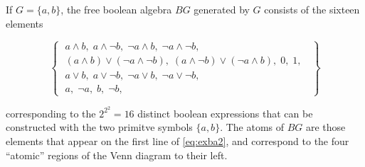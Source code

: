 \documentclass[subfiles]{the-pdg-manual.tex}
\begin{document}
\begin{example}
	If $G = \{a, b\}$, the free boolean algebra $BG$ generated by $G$ consists of the sixteen elements

	\medskip
	\begin{minipage}{0.3\textwidth}
		\begin{center}%
			\label{fig:ven2BA}
		\end{center}
	\end{minipage}\begin{minipage}{0.65\textwidth}
		\begin{equation} \left\{\;
			\begin{aligned}
				a \land b,\; a \land \lnot b,\; \lnot a \land b,\; \lnot a \land \lnot b,\; \\
				(a\land b) \lor(\lnot a \land \lnot b),\; (a\land \lnot b) \lor (\lnot a \land b),\; 0,\; 1,\;\\
				a \lor b,\; a \lor \lnot b,\;  \lnot a \lor b,\; \lnot a \lor \lnot b,\; \\
				a,\; \lnot a,\; b,\; \lnot b,\;
			\end{aligned}\;
			\right\} \label{eq:exba2} \end{equation}
	\end{minipage}
	\par\smallskip\noindent
	corresponding to the $2^{2^2} = 16$ distinct boolean expressions that can be constructed with the two primitve symbols $\{a, b\}$. The atoms of $BG$ are those elements that appear on the first line of \eqref{eq:exba2}, and correspond to the four ``atomic'' regions of the Venn diagram to their left.
\end{example}
\end{document}
